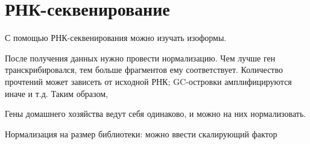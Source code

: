 \documentclass[main.tex]{subfiles}
\begin{document}
\section{РНК-секвенирование}

С помощью РНК-секвенирования можно изучать изоформы.

После получения данных нужно провести нормализацию.
Чем лучше ген транскрибировался, тем больше фрагментов ему соответствует.
Количество прочтений может зависеть от исходной РНК; GC-островки амплифицируются иначе и т.д.
Таким образом, %

Гены домашнего хозяйства ведут себя одинаково, и можно на них нормализовать.

Нормализация на размер библиотеки: можно ввести скалирующий фактор
\end{document}

